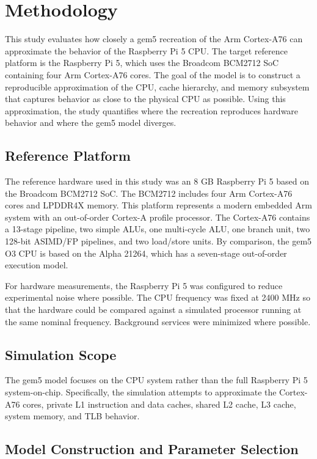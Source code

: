 \documentclass[acmlarge]{acmart}
\begin{document}
\section{Methodology}

This study evaluates how closely a gem5 recreation of the Arm Cortex-A76 can
approximate the behavior of the Raspberry Pi 5 CPU. The target reference platform
is the Raspberry Pi 5, which uses the Broadcom BCM2712 SoC containing four Arm
Cortex-A76 cores. The goal of the model is to construct a reproducible
approximation of the CPU, cache hierarchy, and memory subsystem that captures
behavior as close to the physical CPU as possible. Using this approximation, the
study quantifies where the recreation reproduces hardware behavior and where the
gem5 model diverges.

\subsection{Reference Platform}

The reference hardware used in this study was an 8 GB Raspberry Pi 5 based on
the Broadcom BCM2712 SoC. The BCM2712 includes four Arm Cortex-A76 cores and
LPDDR4X memory. This platform represents a modern embedded Arm system with an
out-of-order Cortex-A profile processor. The Cortex-A76 contains a 13-stage
pipeline, two simple ALUs, one multi-cycle ALU, one branch unit, two 128-bit
ASIMD/FP pipelines, and two load/store units\cite{CortexOptimizationGuide}. By
comparison, the gem5 O3 CPU is based on the Alpha 21264, which has a seven-stage
out-of-order execution model\cite{584667}.

For hardware measurements, the Raspberry Pi 5 was configured to reduce
experimental noise where possible. The CPU frequency was fixed at 2400 MHz so
that the hardware could be compared against a simulated processor running at the
same nominal frequency. Background services were minimized where possible.

\subsection{Simulation Scope}

The gem5 model focuses on the CPU system rather than the full Raspberry Pi 5
system-on-chip. Specifically, the simulation attempts to approximate the
Cortex-A76 cores, private L1 instruction and data caches, shared L2 cache, L3
cache, system memory, and TLB behavior.

\subsection{Model Construction and Parameter Selection}
\end{document}

